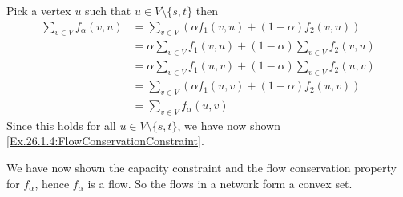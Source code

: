 Pick a vertex $u$ such that $u\in V\setminus\{s,t\}$ then 
\begin{align*}
  \sum_{v\in V}f_{\alpha}(v,u) &= \sum_{v\in V} \left(\alpha f_1(v,u) + (1- \alpha)f_2(v,u) \right)\\
    &= \alpha \sum_{v\in V} f_1(v,u) + (1- \alpha) \sum_{v\in V} f_2(v,u)\\
    &= \alpha \sum_{v\in V} f_1(u,v) + (1- \alpha) \sum_{v\in V} f_2(u,v)\\
    &= \sum_{v\in V} \left(\alpha f_1(u,v) + (1- \alpha)f_2(u,v) \right)\\
    &= \sum_{v\in V}f_{\alpha}(u,v)
\end{align*}
Since this holds for all $u\in V\setminus\{s,t\}$, we have now shown \eqref{Ex.26.1.4:FlowConservationConstraint}.

We have now shown the capacity constraint and the flow conservation property for $f_{\alpha}$, hence $f_{\alpha}$ is a flow. So the flows in a network form a convex set.